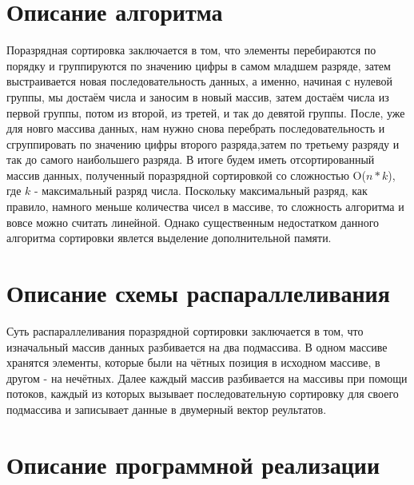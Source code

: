 \documentclass{report}
\begin{document}
\section*{Описание алгоритма}
\par Поразрядная сортировка заключается в том, что элементы перебираются по порядку и группируются по значению цифры в самом младшем разряде, затем выстраивается новая последовательность данных, а именно, начиная с нулевой группы, мы достаём числа и заносим в новый массив, затем достаём числа из первой группы, потом из второй, из третей, и так до девятой группы. После, уже для новго массива данных, нам нужно снова перебрать последовательность и сгруппировать по значению цифры второго разряда,затем по третьему разряду и так до самого наибольшего разряда. В итоге будем иметь отсортированный массив данных, полученный поразрядной сортировкой со сложностью O($n*k$), где $k$ - максимальный разряд числа. Поскольку максимальный разряд, как правило, намного меньше количества чисел в массиве, то сложность алгоритма и вовсе можно считать линейной. Однако существенным недостатком данного алгоритма сортировки явлется выделение дополнительной памяти. 
\newpage

\section*{Описание схемы распараллеливания}
\par Суть распараллеливания поразрядной сортировки заключается в том, что изначальный массив данных разбивается на два подмассива. В одном массиве хранятся элементы, которые были на чётных позиция в исходном массиве, в другом - на нечётных. Далее каждый массив разбивается на массивы при помощи потоков,
каждый из которых вызывает последовательную сортировку для своего подмассива и записывает данные в двумерный вектор реультатов.
\newpage

\section*{Описание программной реализации}
\end{document}
